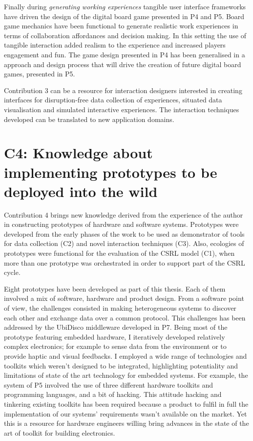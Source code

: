 Finally during \emph{generating working experiences} tangible user
interface frameworks have driven the design of the digital board game
presented in P4 and P5. Board game mechanics have been functional to
generate realistic work experiences in terms of collaboration
affordances and decision making. In this setting the use of tangible
interaction added realism to the experience and increased players
engagement and fun. The game design presented in P4 has been generalised
in a approach and design process that will drive the creation of future
digital board games, presented in P5.

Contribution 3 can be a resource for interaction designers interested in
creating interfaces for disruption-free data collection of experiences,
situated data visualisation and simulated interactive experiences. The
interaction techniques developed can be translated to new application
domains.

\section{C4: Knowledge about implementing prototypes to be deployed into
the
wild}\label{c4-knowledge-about-implementing-prototypes-to-be-deployed-into-the-wild}

Contribution 4 brings new knowledge derived from the experience of the
author in constructing prototypes of hardware and software systems.
Prototypes were developed from the early phases of the work to be used
as demonstrator of tools for data collection (C2) and novel interaction
techniques (C3). Also, ecologies of prototypes were functional for the
evaluation of the CSRL model (C1), when more than one prototype was
orchestrated in order to support part of the CSRL cycle.

Eight prototypes have been developed as part of this thesis. Each of
them involved a mix of software, hardware and product design. From a
software point of view, the challenges consisted in making heterogeneous
systems to discover each other and exchange data over a common protocol.
This challenges has been addressed by the UbiDisco middleware developed
in P7. Being most of the prototype featuring embedded hardware, I
iteratively developed relatively complex electronics; for example to
sense data from the environment or to provide haptic and visual
feedbacks. I employed a wide range of technologies and toolkits which
weren't designed to be integrated, highlighting potentiality and
limitations of state of the art technology for embedded systems. For
example, the system of P5 involved the use of three different hardware
toolkits and programming languages, and a bit of hacking. This attitude
hacking and tinkering existing toolkits has been required because a
product to fulfil in full the implementation of our systems'
requirements wasn't available on the market. Yet this is a resource for
hardware engineers willing bring advances in the state of the art of
toolkit for building electronics.

